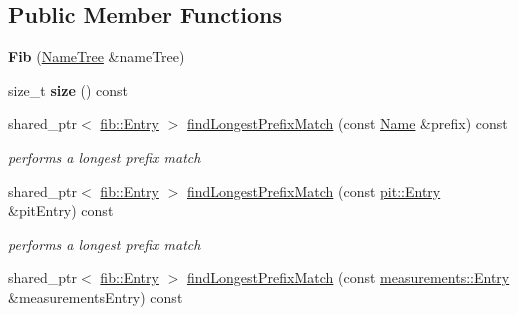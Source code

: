 \subsection*{Public Member Functions}
\begin{DoxyCompactItemize}
\item 
{\bfseries Fib} (\hyperlink{classnfd_1_1NameTree}{Name\+Tree} \&name\+Tree)\hypertarget{classnfd_1_1Fib_a1ed3dd88fe19112ce99be346e87cecbf}{}\label{classnfd_1_1Fib_a1ed3dd88fe19112ce99be346e87cecbf}

\item 
size\+\_\+t {\bfseries size} () const\hypertarget{classnfd_1_1Fib_ae240e9ad4bff8b3816577115a552c8e6}{}\label{classnfd_1_1Fib_ae240e9ad4bff8b3816577115a552c8e6}

\item 
shared\+\_\+ptr$<$ \hyperlink{classnfd_1_1fib_1_1Entry}{fib\+::\+Entry} $>$ \hyperlink{classnfd_1_1Fib_a51e0149d3ab81eec744117a8d5fefa69}{find\+Longest\+Prefix\+Match} (const \hyperlink{classndn_1_1Name}{Name} \&prefix) const\hypertarget{classnfd_1_1Fib_a51e0149d3ab81eec744117a8d5fefa69}{}\label{classnfd_1_1Fib_a51e0149d3ab81eec744117a8d5fefa69}

\begin{DoxyCompactList}\small\item\em performs a longest prefix match \end{DoxyCompactList}\item 
shared\+\_\+ptr$<$ \hyperlink{classnfd_1_1fib_1_1Entry}{fib\+::\+Entry} $>$ \hyperlink{classnfd_1_1Fib_a4cd178cf106684c16ba657e7fd3e742f}{find\+Longest\+Prefix\+Match} (const \hyperlink{classnfd_1_1pit_1_1Entry}{pit\+::\+Entry} \&pit\+Entry) const\hypertarget{classnfd_1_1Fib_a4cd178cf106684c16ba657e7fd3e742f}{}\label{classnfd_1_1Fib_a4cd178cf106684c16ba657e7fd3e742f}

\begin{DoxyCompactList}\small\item\em performs a longest prefix match \end{DoxyCompactList}\item 
shared\+\_\+ptr$<$ \hyperlink{classnfd_1_1fib_1_1Entry}{fib\+::\+Entry} $>$ \hyperlink{classnfd_1_1Fib_a178a7ec2c7c4e5c7f22a97f5ac45fb8a}{find\+Longest\+Prefix\+Match} (const \hyperlink{classnfd_1_1measurements_1_1Entry}{measurements\+::\+Entry} \&measurements\+Entry) const\hypertarget{classnfd_1_1Fib_a178a7ec2c7c4e5c7f22a97f5ac45fb8a}{}\label{classnfd_1_1Fib_a178a7ec2c7c4e5c7f22a97f5ac45fb8a}


\end{DoxyCompactItemize}
